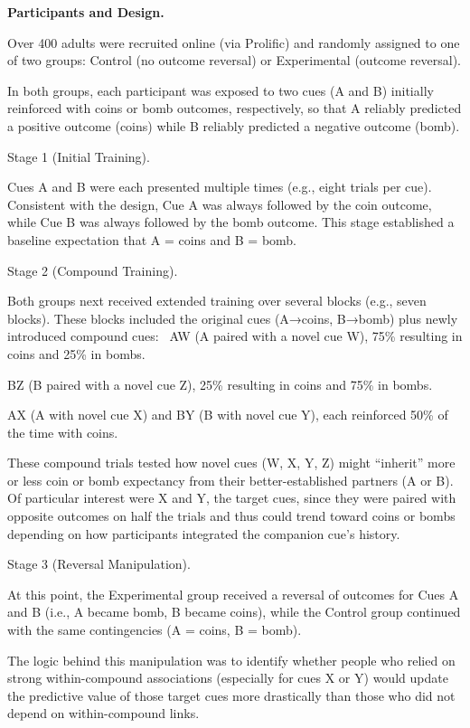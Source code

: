 \documentclass[
  letterpaper,
  DIV=11,
  numbers=noendperiod]{scrartcl}
\begin{document}
\textbf{Participants and Design.}

Over 400 adults were recruited online (via Prolific) and randomly
assigned to one of two groups: Control (no outcome reversal) or
Experimental (outcome reversal).

In both groups, each participant was exposed to two cues (A and B)
initially reinforced with coins or bomb outcomes, respectively, so that
A reliably predicted a positive outcome (coins) while B reliably
predicted a negative outcome (bomb).

Stage 1 (Initial Training).

Cues A and B were each presented multiple times (e.g., eight trials per
cue). Consistent with the design, Cue A was always followed by the coin
outcome, while Cue B was always followed by the bomb outcome. This stage
established a baseline expectation that A = coins and B = bomb.

Stage 2 (Compound Training).

Both groups next received extended training over several blocks (e.g.,
seven blocks). These blocks included the original cues (A→coins, B→bomb)
plus newly introduced compound cues:~ AW (A paired with a novel cue W),
75\% resulting in coins and 25\% in bombs.

BZ (B paired with a novel cue Z), 25\% resulting in coins and 75\% in
bombs.

AX (A with novel cue X) and BY (B with novel cue Y), each reinforced
50\% of the time with coins.

These compound trials tested how novel cues (W, X, Y, Z) might
``inherit'' more or less coin or bomb expectancy from their
better-established partners (A or B). Of particular interest were X and
Y, the target cues, since they were paired with opposite outcomes on
half the trials and thus could trend toward coins or bombs depending on
how participants integrated the companion cue's history.

Stage 3 (Reversal Manipulation).

At this point, the Experimental group received a reversal of outcomes
for Cues A and B (i.e., A became bomb, B became coins), while the
Control group continued with the same contingencies (A = coins, B =
bomb).

The logic behind this manipulation was to identify whether people who
relied on strong within-compound associations (especially for cues X or
Y) would update the predictive value of those target cues more
drastically than those who did not depend on within-compound links.
\end{document}
